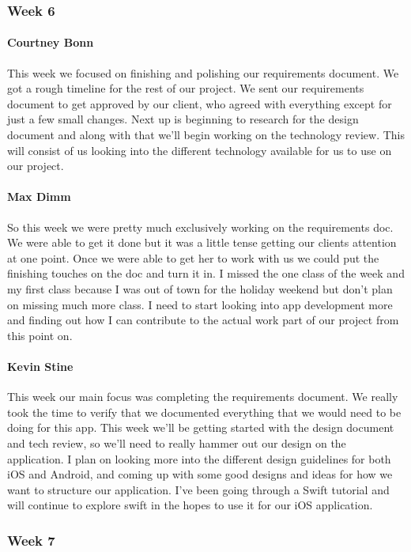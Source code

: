 		\subsubsection{Week 6}

			\paragraph{Courtney Bonn}
			This week we focused on finishing and polishing our requirements document. We got a rough timeline for the rest of our project. We sent our requirements document to get approved by our client, who agreed with everything except for just a few small changes. Next up is beginning to research for the design document and along with that we'll begin working on the technology review. This will consist of us looking into the different technology available for us to use on our project.

			\paragraph{Max Dimm}
			So this week we were pretty much exclusively working on the requirements doc. We were able to get it done but it was a little tense getting our clients attention at one point. Once we were able to get her to work with us we could put the finishing touches on the doc and turn it in. I missed the one class of the week and my first class because I was out of town for the holiday weekend but don't plan on missing much more class. I need to start looking into app development more and finding out how I can contribute to the actual work part of our project from this point on.

			\paragraph{Kevin Stine}
			This week our main focus was completing the requirements document. We really took the time to verify that we documented everything that we would need to be doing for this app. This week we'll be getting started with the design document and tech review, so we'll need to really hammer out our design on the application. I plan on looking more into the different design guidelines for both iOS and Android, and coming up with some good designs and ideas for how we want to structure our application. I've been going through a Swift tutorial and will continue to explore swift in the hopes to use it for our iOS application.

		\subsubsection{Week 7}

